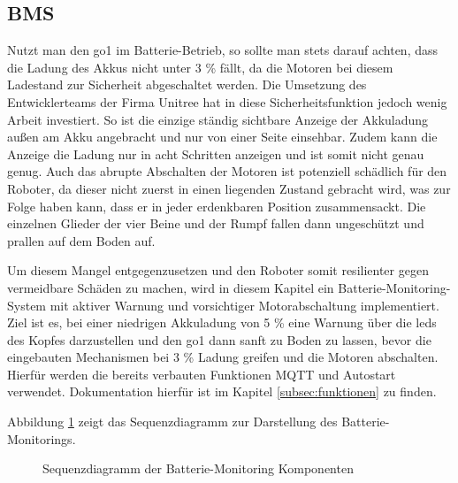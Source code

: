\subsection{BMS}
\label{subsec:bms-monitor}

Nutzt man den \gls{go1} im Batterie-Betrieb, so sollte man stets darauf achten, dass die Ladung des Akkus nicht unter
\num{3} \% fällt, da die Motoren bei diesem Ladestand zur Sicherheit abgeschaltet werden.
Die Umsetzung des Entwicklerteams der Firma Unitree hat in diese Sicherheitsfunktion jedoch wenig Arbeit investiert.
So ist die einzige ständig sichtbare Anzeige der Akkuladung außen am Akku angebracht und nur von einer Seite einsehbar.
Zudem kann die Anzeige die Ladung nur in acht Schritten anzeigen und ist somit nicht genau genug.
Auch das abrupte Abschalten der Motoren ist potenziell schädlich für den Roboter, da dieser nicht zuerst in einen liegenden
Zustand gebracht wird, was zur Folge haben kann, dass er in jeder erdenkbaren Position zusammensackt.
Die einzelnen Glieder der vier Beine und der Rumpf fallen dann ungeschützt und prallen auf dem Boden auf.

Um diesem Mangel entgegenzusetzen und den Roboter somit resilienter gegen vermeidbare Schäden zu machen, wird in diesem
Kapitel ein Batterie-Monitoring-System mit aktiver Warnung und vorsichtiger Motorabschaltung implementiert.
Ziel ist es, bei einer niedrigen Akkuladung von \num{5} \% eine Warnung über die \glspl{led} des Kopfes darzustellen und den
\gls{go1} dann sanft zu Boden zu lassen, bevor die eingebauten Mechanismen bei \num{3} \% Ladung greifen und die Motoren
abschalten.
Hierfür werden die bereits verbauten Funktionen MQTT und Autostart verwendet.
Dokumentation hierfür ist im Kapitel \ref{subsec:funktionen} zu finden.


Abbildung \ref{fig:sequenz-bms} zeigt das Sequenzdiagramm zur Darstellung des Batterie-\allowbreak Monitorings.

\begin{figure}[h]
    \caption{Sequenzdiagramm der Batterie-Monitoring Komponenten}\label{fig:sequenz-bms}
\end{figure}

